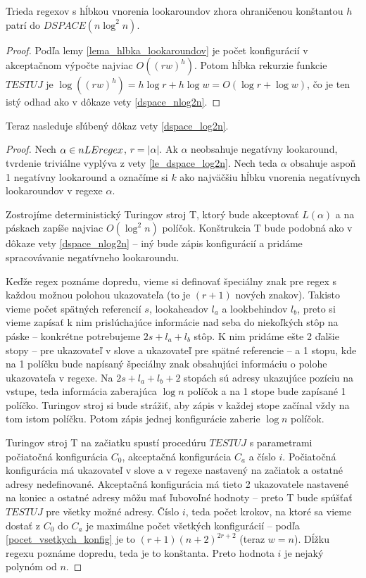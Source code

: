 \begin{dosledok}
Trieda regexov s hĺbkou vnorenia lookaroundov zhora ohraničenou konštantou $h$ patrí do $DSPACE(n\log^2 n)$.
\end{dosledok}
\begin{proof}
Podľa lemy \ref{lema_hlbka_lookaroundov} je počet konfigurácií v akceptačnom výpočte najviac $O((rw)^h)$. Potom hĺbka rekurzie funkcie $TESTUJ$ je $\log((rw)^h) = h\log r + h\log w = O(\log r+\log w)$, čo je ten istý odhad ako v dôkaze vety \ref{dspace_nlog2n}.
\end{proof}

Teraz nasleduje sľúbený dôkaz vety \ref{dspace_log2n}.
\begin{proof}
Nech $\alpha\in nLEregex$, $r=|\alpha|$. Ak $\alpha$ neobsahuje negatívny lookaround, tvrdenie triviálne vyplýva z vety \ref{le_dspace_log2n}. Nech teda $\alpha$ obsahuje aspoň 1 negatívny lookaround a označíme si $k$ ako najväčšiu hĺbku vnorenia negatívnych lookaroundov v regexe $\alpha$.

Zostrojíme deterministický Turingov stroj T, ktorý bude akceptovať $L(\alpha)$ a na páskach zapíše najviac $O(\log^2 n)$ políčok. Konštrukcia T bude podobná ako v dôkaze vety \ref{dspace_nlog2n} -- iný bude zápis konfigurácií a pridáme spracovávanie negatívneho lookaroundu.

Keďže regex poznáme dopredu, vieme si definovať špeciálny znak pre regex s každou možnou polohou ukazovateľa (to je $(r+1)$ nových znakov). Takisto vieme počet spätných referencií $s$, lookaheadov $l_a$ a lookbehindov $l_b$, preto si vieme zapísať k nim prislúchajúce informácie nad seba do niekoľkých stôp na páske -- konkrétne potrebujeme $2s+l_a+l_b$ stôp. K nim pridáme ešte 2 ďalšie stopy -- pre ukazovateľ v slove a ukazovateľ pre spätné referencie -- a 1 stopu, kde na 1 políčku bude napísaný špeciálny znak obsahujúci informáciu o polohe ukazovateľa v regexe. Na $2s+l_a+l_b+2$ stopách sú adresy ukazujúce pozíciu na vstupe, teda informácia zaberajúca $\log n$ políčok a na 1 stope bude zapísané 1 políčko. Turingov stroj si bude strážiť, aby zápis v každej stope začínal vždy na tom istom políčku. Potom zápis jednej konfigurácie zaberie $\log n$ políčok.

Turingov stroj T na začiatku spustí procedúru $TESTUJ$ s parametrami počiatočná konfigurácia $C_0$, akceptačná konfigurácia $C_a$ a číslo $i$. Počiatočná konfigurácia má ukazovateľ v slove a v regexe nastavený na začiatok a ostatné adresy nedefinované. Akceptačná konfigurácia má tieto 2 ukazovatele nastavené na koniec a ostatné adresy môžu mať ľubovoľné hodnoty -- preto T bude spúšťať $TESTUJ$ pre všetky možné adresy. Číslo $i$, teda počet krokov, na ktoré sa vieme dostať z $C_0$ do $C_a$ je maximálne počet všetkých konfigurácií -- podľa \ref{pocet_vsetkych_konfig} je to $(r+1)(n+2)^{2r+2}$ (teraz $w=n$). Dĺžku regexu poznáme dopredu, teda je to konštanta. Preto hodnota $i$ je nejaký polynóm od $n$.


\end{proof}
